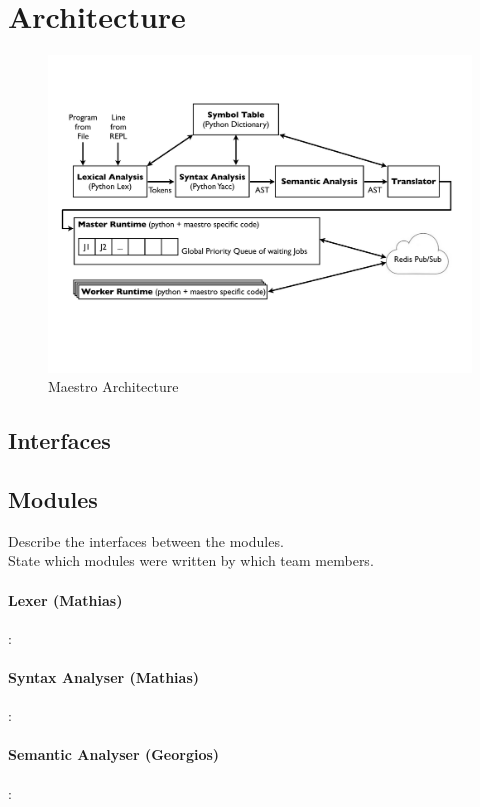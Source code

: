 \section{Architecture}

\begin{figure}[h!]
  \centering
  \includegraphics[width=15cm]{figures/archi.pdf}
  \caption{Maestro Architecture}
\end{figure}

\subsection{Interfaces}

\subsection{Modules}
Describe the interfaces between the modules.\\

State which modules were written by which team members.

\paragraph{Lexer (Mathias)}:
\paragraph{Syntax Analyser (Mathias)}:
\paragraph{Semantic Analyser (Georgios)}:
